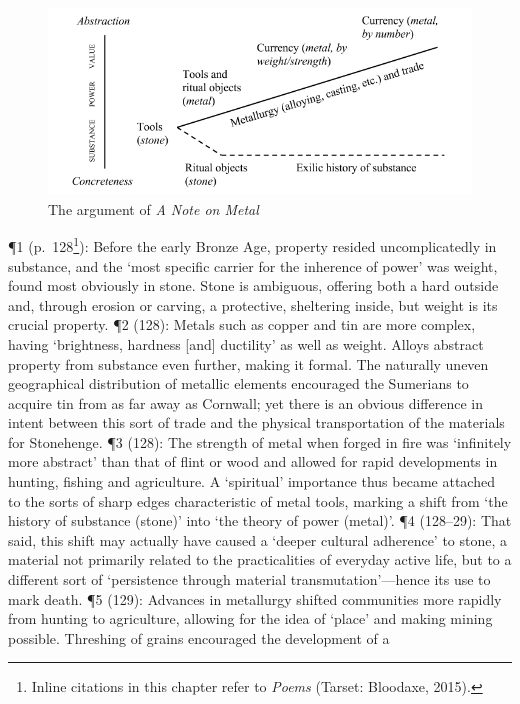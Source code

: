 \documentclass[]{article}
\begin{document}
\begin{figure}[t]
\centering
\includegraphics{figs/anm.png}
\caption{The argument of \emph{A Note on Metal}\label{fig:anm}}
\end{figure}

¶1 (p.~128\footnote{Inline citations in this chapter refer to
  \emph{Poems} (Tarset: Bloodaxe, 2015).}): Before the early Bronze Age,
property resided uncomplicatedly in substance, and the `most specific
carrier for the inherence of power' was weight, found most obviously in
stone. Stone is ambiguous, offering both a hard outside and, through
erosion or carving, a protective, sheltering inside, but weight is its
crucial property. ¶2 (128): Metals such as copper and tin are more
complex, having `brightness, hardness {[}and{]} ductility' as well as
weight. Alloys abstract property from substance even further, making it
formal. The naturally uneven geographical distribution of metallic
elements encouraged the Sumerians to acquire tin from as far away as
Cornwall; yet there is an obvious difference in intent between this sort
of trade and the physical transportation of the materials for
Stonehenge. ¶3 (128): The strength of metal when forged in fire was
`infinitely more abstract' than that of flint or wood and allowed for
rapid developments in hunting, fishing and agriculture. A `spiritual'
importance thus became attached to the sorts of sharp edges
characteristic of metal tools, marking a shift from `the history of
substance (stone)' into `the theory of power (metal)'. ¶4 (128--29):
That said, this shift may actually have caused a `deeper cultural
adherence' to stone, a material not primarily related to the
practicalities of everyday active life, but to a different sort of
`persistence through material transmutation'---hence its use to mark
death. ¶5 (129): Advances in metallurgy shifted communities more rapidly
from hunting to agriculture, allowing for the idea of `place' and making
mining possible. Threshing of grains encouraged the development of a
\end{document}
